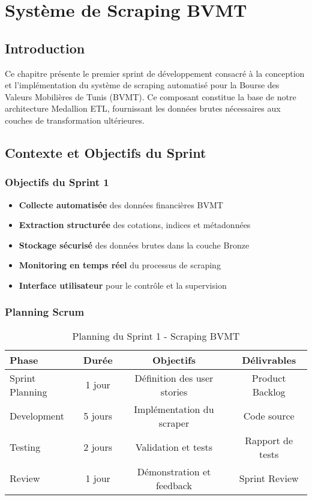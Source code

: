 \chapter{Système de Scraping BVMT}

\section*{Introduction}

Ce chapitre présente le premier sprint de développement consacré à la conception et l'implémentation du système de scraping automatisé pour la Bourse des Valeurs Mobilières de Tunis (BVMT). Ce composant constitue la base de notre architecture Medallion ETL, fournissant les données brutes nécessaires aux couches de transformation ultérieures.

\section{Contexte et Objectifs du Sprint}

\subsection{Objectifs du Sprint 1}

\begin{itemize}
    \item \textbf{Collecte automatisée} des données financières BVMT
    \item \textbf{Extraction structurée} des cotations, indices et métadonnées
    \item \textbf{Stockage sécurisé} des données brutes dans la couche Bronze
    \item \textbf{Monitoring en temps réel} du processus de scraping
    \item \textbf{Interface utilisateur} pour le contrôle et la supervision
\end{itemize}

\subsection{Planning Scrum}

\begin{table}[H]
\centering
\begin{tabular}{|L|C|C|C|}
\hline
\textbf{Phase} & \textbf{Durée} & \textbf{Objectifs} & \textbf{Délivrables} \\
\hline
Sprint Planning & 1 jour & Définition des user stories & Product Backlog \\
\hline
Development & 5 jours & Implémentation du scraper & Code source \\
\hline
Testing & 2 jours & Validation et tests & Rapport de tests \\
\hline
Review & 1 jour & Démonstration et feedback & Sprint Review \\
\hline
\end{tabular}
\caption{Planning du Sprint 1 - Scraping BVMT}
\label{tab:sprint1_planning}
\end{table}

